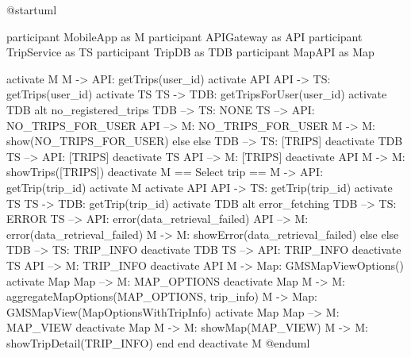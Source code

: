 @startuml

participant MobileApp as M
participant APIGateway as API
participant TripService as TS
participant TripDB as TDB
participant MapAPI as Map

activate M
M -> API: getTrips(user_id)
activate API
API -> TS: getTrips(user_id)
activate TS
TS -> TDB: getTripsForUser(user_id)
activate TDB
alt no_registered_trips
TDB --> TS: NONE
TS --> API: NO_TRIPS_FOR_USER
API --> M: NO_TRIPS_FOR_USER
M -> M: show(NO_TRIPS_FOR_USER)
else else
TDB --> TS: [TRIPS]
deactivate TDB
TS --> API: [TRIPS]
deactivate TS
API --> M: [TRIPS]
deactivate API
M -> M: showTrips([TRIPS])
deactivate M
== Select trip ==
M -> API: getTrip(trip_id)
activate M
activate API
API -> TS: getTrip(trip_id)
activate TS
TS -> TDB: getTrip(trip_id)
activate TDB
alt error_fetching
TDB --> TS: ERROR
TS --> API: error(data_retrieval_failed)
API --> M: error(data_retrieval_failed)
M -> M: showError(data_retrieval_failed)
else else 
TDB --> TS: TRIP_INFO
deactivate TDB
TS --> API: TRIP_INFO
deactivate TS
API --> M: TRIP_INFO
deactivate API
M -> Map: GMSMapViewOptions()
activate Map
Map --> M: MAP_OPTIONS
deactivate Map
M -> M: aggregateMapOptions(MAP_OPTIONS, trip_info)
M -> Map: GMSMapView(MapOptionsWithTripInfo)
activate Map
Map --> M: MAP_VIEW
deactivate Map
M -> M: showMap(MAP_VIEW)
M -> M: showTripDetail(TRIP_INFO) 
end
end
deactivate M
@enduml

